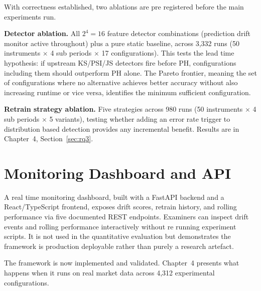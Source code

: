 With correctness established, two ablations are pre registered before the main experiments run.

\textbf{Detector ablation.} All $2^4{=}16$ feature detector combinations (prediction drift monitor active throughout) plus a pure static baseline, across 3,332 runs (50 instruments $\times$ 4 sub periods $\times$ 17 configurations). This tests the lead time hypothesis: if upstream KS/PSI/JS detectors fire before PH, configurations including them should outperform PH alone. The Pareto frontier, meaning the set of configurations where no alternative achieves better accuracy without also increasing runtime or vice versa, identifies the minimum sufficient configuration.

\textbf{Retrain strategy ablation.} Five strategies across 980 runs (50 instruments $\times$ 4 sub periods $\times$ 5 variants), testing whether adding an error rate trigger to distribution based detection provides any incremental benefit. Results are in Chapter~4, Section~\ref{sec:rq3}.

\section{Monitoring Dashboard and API}
\label{sec:dashboard}

A real time monitoring dashboard, built with a FastAPI backend and a React/TypeScript frontend, exposes drift scores, retrain history, and rolling performance via five documented REST endpoints. Examiners can inspect drift events and rolling performance interactively without re running experiment scripts. It is not used in the quantitative evaluation but demonstrates the framework is production deployable rather than purely a research artefact.

The framework is now implemented and validated. Chapter~4 presents what happens when it runs on real market data across 4,312 experimental configurations.